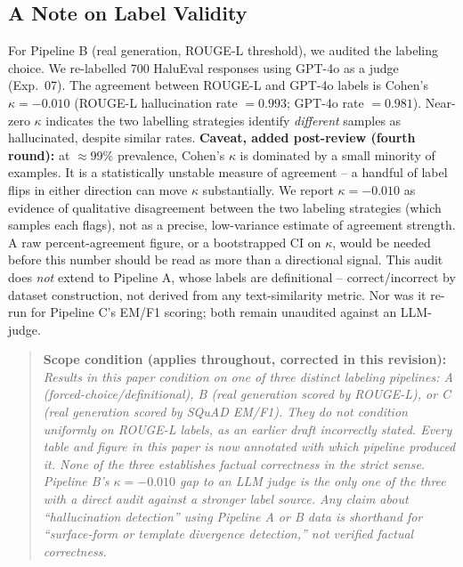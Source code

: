 \documentclass[10pt,twocolumn]{article}
\begin{document}
\subsection{A Note on Label Validity}
\label{sec:setup-labels}

For Pipeline B (real generation, ROUGE-L threshold), we audited the
labeling choice. We re-labelled 700 HaluEval responses using GPT-4o as a
judge (Exp.~07). The agreement between ROUGE-L and GPT-4o labels is
Cohen's $\kappa = -0.010$ (ROUGE-L hallucination rate $= 0.993$; GPT-4o
rate $= 0.981$). Near-zero $\kappa$ indicates the two labelling
strategies identify \emph{different} samples as hallucinated, despite
similar rates. \textbf{Caveat, added post-review (fourth round):} at
$\approx$99\% prevalence, Cohen's $\kappa$ is dominated by a small
minority of examples. It is a statistically unstable measure of
agreement -- a handful of label flips in either direction can move
$\kappa$ substantially. We report $\kappa=-0.010$ as evidence of
qualitative disagreement between the two labeling strategies (which
samples each flags), not as a precise, low-variance estimate of
agreement strength. A raw percent-agreement figure, or a bootstrapped CI
on $\kappa$, would be needed before this number should be read as more
than a directional signal. This audit does \emph{not} extend to
Pipeline A, whose labels are definitional -- correct/incorrect by
dataset construction, not derived from any text-similarity metric. Nor
was it re-run for Pipeline C's EM/F1 scoring; both remain unaudited
against an LLM-judge.

\begin{quote}
\textbf{Scope condition (applies throughout, corrected in this revision):}
\textit{Results in this paper condition on \emph{one of three distinct
labeling pipelines}: A (forced-choice/definitional), B (real generation
scored by ROUGE-L), or C (real generation scored by SQuAD EM/F1). They
do not condition uniformly on ROUGE-L labels, as an earlier draft
incorrectly stated. Every table and figure in this paper is now
annotated with which pipeline produced it. None of the three establishes
factual correctness in the strict sense. Pipeline B's $\kappa = -0.010$
gap to an LLM judge is the only one of the three with a direct audit
against a stronger label source. Any claim about ``hallucination
detection'' using Pipeline A or B data is shorthand for ``surface-form
or template divergence detection,'' not verified factual correctness.}
\end{quote}
\end{document}
